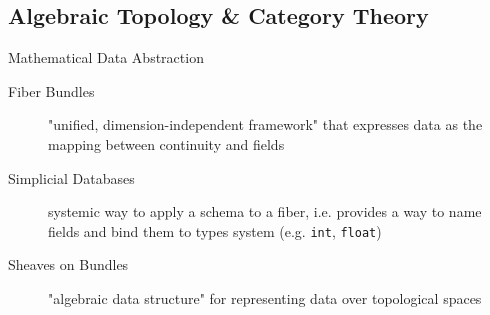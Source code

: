 \documentclass[xcolor={dvipsnames}, handout]{beamer}
\begin{document}

\subsection{Algebraic Topology & Category Theory}

\begin{frame}{Mathematical Data Abstraction}
    \begin{description}
        \item[Fiber Bundles] "unified, dimension-independent framework" that expresses data as the mapping between continuity and fields \cite{butlerVectorBundleClassesForm1992,butlerVisualizationModelBased1989}
        \item[Simplicial Databases] systemic way to apply a schema to a fiber, i.e. provides a way to name fields and bind them to types system (e.g. \texttt{int}, \texttt{float}) 
         \cite{spivakSIMPLICIALDATABASES, spivakDatabasesAreCategories2010} 
        \item[Sheaves on Bundles] "algebraic data structure" for representing data over topological spaces \cite{ghristElementaryAppliedTopology2014}
    \end{description}
\end{frame}
\end{document}
